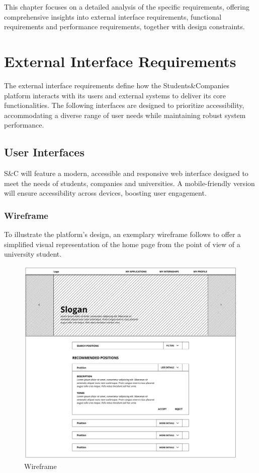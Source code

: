 This chapter focuses on a detailed analysis of the specific requirements, offering comprehensive insights into external interface requirements, functional requirements and performance requirements, together with design constraints.

\section{External Interface Requirements}
The external interface requirements define how the Students\&Companies platform interacts with its users and external systems to deliver its core functionalities.
The following interfaces are designed to prioritize accessibility, accommodating a diverse range of user needs while maintaining robust system performance.

\subsection{User Interfaces}
S\&C will feature a modern, accessible and responsive web interface designed to meet the needs of students, companies and universities.
A mobile-friendly version will ensure accessibility across devices, boosting user engagement.

\subsubsection{Wireframe}
To illustrate the platform’s design, an exemplary wireframe follows to offer a simplified visual representation of the home page from the point of view of a university student.

\begin{figure}
    \centering
    \includegraphics[width=16cm]{images/wireframe.png}
    \caption{Wireframe}
\end{figure}

